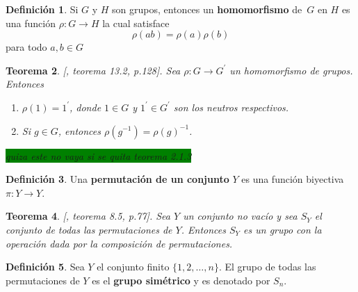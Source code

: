 \documentclass[12pt]{book}
\newtheorem{theorem}{Teorema}[section]
\theoremstyle{definition}
\newtheorem{definition}[theorem]{Definición}
\DeclareMathOperator{\im}{im}
\newcounter{in}
\newcounter{ini}
\begin{document}
\begin{definition}
  Si $G$ y $H$ son grupos, entonces un \textbf{homomorfismo} de~$G$
  en $H$ es una función $\rho:G\rightarrow H$ la cual
  satisface $$\rho(ab)=\rho(a)\rho(b)$$ para todo $a,b \in G$
\end{definition}

\begin{theorem}{[\cite{fraleigh}, teorema 13.2, p.128]}.
  Sea $\rho:G\rightarrow G^{'}$ un homomorfismo de grupos. Entonces
  \begin{enumerate}
    \item $\rho(1)=1^{'}$, donde $1\in G$ y  $1^{'}\in G^{'}$ son los
    neutros respectivos. 
    \item Si $g\in G$, entonces $\rho(g^{-1})=\rho (g)^{-1}$.
  \end{enumerate}
{\setlength{\fboxsep}{0pt}\colorbox{green}{quiza este no vaya si se
    quita teorema 2.1.3}}
\end{theorem}


\begin{definition}
  Una \textbf{permutación de un conjunto} $Y$ es una función biyectiva
  $\pi:Y\rightarrow Y$.
\end{definition}

\begin{theorem}{[\cite{fraleigh}, teorema 8.5, p.77]}.
  Sea $Y$ un conjunto no vacío y sea $S_{Y}$ el conjunto de todas las
  permutaciones de $Y$. Entonces $S_{Y}$ es un grupo con la operación dada por la composición de
  permutaciones.
\end{theorem}

\begin{definition}
  Sea $Y$ el conjunto finito $\{1,2,\ldots,n\}$. El grupo de todas las
  permutaciones de $Y$ es el\textbf{ grupo simétrico} y es denotado por $S_{n}$.
\end{definition}
\end{document}
